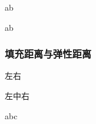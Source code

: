 \documentclass{ctexart}
\begin{document}
        
            \newlength{\mylatexlength} %
            \setlength{\mylatexlength}{10pt} %
            \addtolength{\mylatexlength}{-5pt} %
            a\hspace{\mylatexlength}b 

            a\hspace{5pt}b

        \subsubsection{填充距离与弹性距离}
            左\hfill 右

            左中右

        
            a\hrulefill b\dotfill c

            \hrulefill

            \dotfill
            
\end{document}
